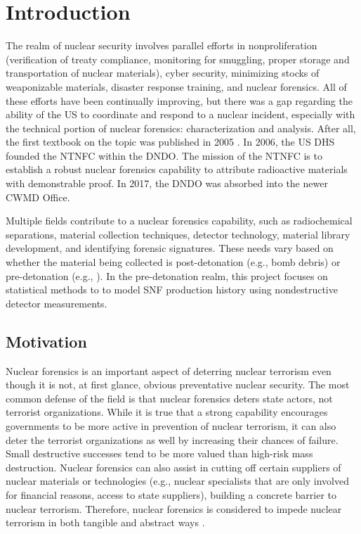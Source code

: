 \chapter{Introduction}
\label{ch:intro}

The realm of nuclear security involves parallel efforts in nonproliferation
(verification of treaty compliance, monitoring for smuggling, proper storage
and transportation of nuclear materials), cyber security, minimizing stocks of
weaponizable materials, disaster response training, and nuclear forensics. All
of these efforts have been continually improving, but there was a gap regarding
the ability of the \gls{US} to coordinate and respond to a nuclear incident,
especially with the technical portion of nuclear forensics: characterization
and analysis. After all, the first textbook on the topic was published in 2005
\cite{nftext_2005}. In 2006, the \gls{US} \gls{DHS} founded the \gls{NTNFC}
within the \gls{DNDO}. The mission of the \gls{NTNFC} is to establish a robust
nuclear forensics capability to attribute radioactive materials with
demonstrable proof. In 2017, the \gls{DNDO} was absorbed into the newer
\gls{CWMD} Office.

Multiple fields contribute to a nuclear forensics capability, such as
radiochemical separations, material collection techniques, detector technology,
material library development, and identifying forensic signatures. These needs
vary based on whether the material being collected is post-detonation (e.g.,
bomb debris) or pre-detonation (e.g., ).  In the pre-detonation
realm, this project focuses on statistical methods to to model \gls{SNF}
production history using nondestructive detector measurements. 

\section{Motivation}
\label{sec:motivation}

Nuclear forensics is an important aspect of deterring nuclear terrorism even
though it is not, at first glance, obvious preventative nuclear security.  The
most common defense of the field is that nuclear forensics deters state actors,
not terrorist organizations. While it is true that a strong capability
encourages governments to be more active in prevention of nuclear terrorism, it
can also deter the terrorist organizations as well by increasing their chances
of failure. Small destructive successes tend to be more valued than high-risk
mass destruction. Nuclear forensics can also assist in cutting off certain
suppliers of nuclear materials or technologies (e.g., nuclear specialists that
are only involved for financial reasons, access to state suppliers), building a
concrete barrier to nuclear terrorism.  Therefore, nuclear forensics is
considered to impede nuclear terrorism in both tangible and abstract ways
\cite{aps_aaas_forensics}.

